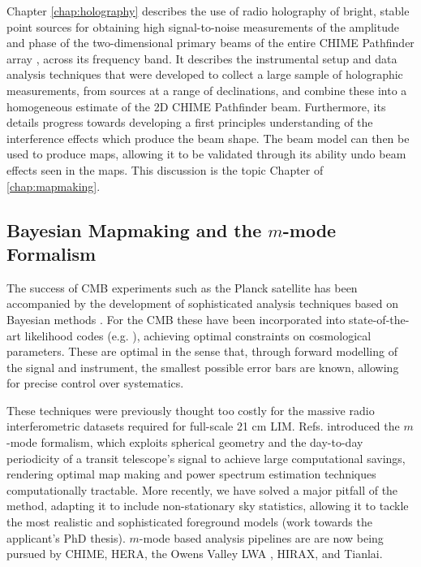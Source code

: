 Chapter \ref{chap:holography} describes the use of radio holography of bright, stable point sources for obtaining high signal-to-noise measurements of the amplitude and phase of the two-dimensional primary beams of the entire CHIME Pathfinder array \citep{chimepath1}, across its frequency band. It describes the instrumental setup and data analysis techniques that were developed to collect a large sample of holographic measurements, from sources at a range of declinations, and combine these into a homogeneous estimate of the 2D CHIME Pathfinder beam. Furthermore, its details progress towards developing a first principles understanding of the interference effects which produce the beam shape. The beam model can then be used to produce maps, allowing it to be validated through its ability undo beam effects seen in the maps. This discussion is the topic Chapter of \ref{chap:mapmaking}.

\subsection{\label{sec:bg:subsec:mmodes} Bayesian Mapmaking and the $m$-mode Formalism}

The success of CMB experiments such as the Planck satellite has been accompanied by the development of sophisticated analysis techniques based on Bayesian methods \citep{bondjaffeknox}. For the CMB these have been incorporated into state-of-the-art likelihood codes (e.g. \citep{commander}), achieving optimal constraints on cosmological parameters. These are optimal in the sense that, through forward modelling of the signal and instrument, the smallest possible error bars are known, allowing for precise control over systematics.

These techniques were previously thought too costly for the massive radio interferometric datasets required for full-scale 21 cm LIM. Refs. \citep{mmodes1, mmodes2} introduced the $m$-mode formalism, which exploits spherical geometry and the day-to-day periodicity of a transit telescope's signal to achieve large computational savings, rendering optimal map making and power spectrum estimation techniques computationally tractable. More recently, we have solved a major pitfall of the method, adapting it to include non-stationary sky statistics, allowing it to tackle the most realistic and sophisticated foreground models \citep{bergeroppermann} (work towards the applicant's PhD thesis). $m$-mode based analysis pipelines are are now being pursued by CHIME, HERA, the Owens Valley LWA \citep{eastwoodetal}, HIRAX, and Tianlai.